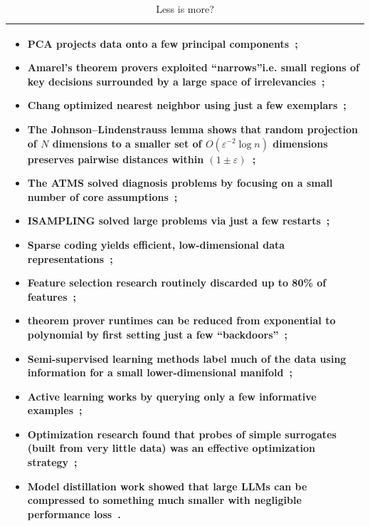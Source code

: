 \documentclass[AMA,STIX2COL]{WileyNJDv5}
\begin{document}
\begin{table}[!t]
\caption{Less is more?}\label{less}
\fontsize{8pt}{9.5pt}\selectfont
\begin{tabular}{p{}}\hline
\begin{itemize}[nosep, topsep=2pt, partopsep=0pt, leftmargin=*]
\item PCA projects data onto a few principal components~\cite{pca}; 
\item Amarel's 
theorem provers exploited ``narrows''i.e. small
regions of key decisions surrounded by a large space of irrelevancies~\cite{Amarel1986}; 
\item Chang
optimized nearest neighbor  using just a few exemplars~\cite{chang74};
\item The Johnson–Lindenstrauss lemma shows that random projection of $N$ dimensions 
to a smaller set of $O(\varepsilon^{-2}\log n)$ dimensions preserves pairwise distances within $(1\pm\varepsilon)$~\cite{johnson1984extensions}; 
\item The ATMS solved diagnosis problems by focusing on
a small number of  core assumptions~\cite{atms}; 
\item ISAMPLING solved large problems via just a few restarts~\cite{Crawford:1994}; 
\item Sparse coding yields efficient, low-dimensional data representations~\cite{olshausen2004sparse}; 
\item Feature selection research routinely  discarded up to 80\% of features~\cite{kohavi97}; 
\item theorem prover runtimes can be    reduced from  exponential   to polynomial by first  setting just a few ``backdoors''~\cite{backdoor}; 
\item Semi-supervised learning methods label much of the data using information
for a small   lower-dimensional  manifold~\cite{zhu05}; 
\item Active learning works by querying only a  few informative examples~\cite{settles2009active}; 
\item Optimization research found that probes of simple surrogates (built from very little data) was an effective optimization strategy~\cite{zul13,guo13};   
\item Model distillation work showed that   large LLMs can be compressed to something much smaller with negligible performance loss~\cite{shi22,yang24}. 
\end{itemize}\\\hline
\end{tabular}
\end{table}
\end{document}

